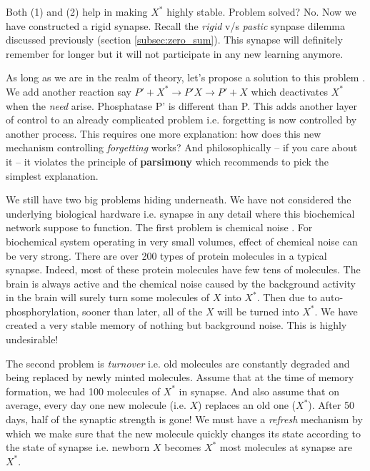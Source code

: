 \documentclass[]{resonance}
\begin{document}
Both (1) and (2) help in making $X^*$ highly stable. Problem solved? No.  Now
we have constructed a rigid synapse. Recall the \textit{rigid} v/s
\textit{pastic} synpase dilemma discussed previously (section
\ref{subsec:zero_sum}). This synapse will definitely remember for longer
but it will not participate in any new learning anymore.

As long as we are in the realm of theory, let's propose a solution to this
problem . We add another reaction say $P'+X^*\rightarrow P'X \rightarrow P'+X$
which deactivates $X^*$ when the \textit{need} arise. Phosphatase P' is different
than P. This adds another layer of control to an already complicated problem i.e.
forgetting is now controlled by another process. This requires one more
explanation: how does this new mechanism controlling \textit{forgetting} works?
And philosophically -- if you care about it -- it violates the principle of
\textbf{parsimony} which recommends to pick the simplest explanation.

We still have two big problems hiding underneath. We have not considered the
underlying biological hardware i.e. synapse in any detail where this biochemical
network suppose to function. The first problem is chemical noise 
. For biochemical system operating in very small volumes,
effect of chemical noise can be very strong.  There are over 200 types of
protein molecules in a typical synapse. Indeed, most of these protein molecules have few
tens of molecules.  The brain is always active and  the chemical noise caused by
the background activity in the brain will surely turn some molecules of $X$ into
$X^*$. Then due to auto-phosphorylation, sooner than later, all of the $X$ will be turned
into $X^*$. We have created a very stable memory of nothing but background
noise. This is highly undesirable!

The second problem is \textit{turnover} i.e. old molecules are constantly degraded
and being replaced by newly minted molecules. Assume that at the time of memory
formation, we had 100 molecules of $X^*$ in synapse. And also assume that on
average, every day one new molecule (i.e. $X$) replaces an old one ($X^*$).
After 50 days, half of the synaptic strength is gone! We must have a
\textit{refresh} mechanism by which we make sure that the new molecule quickly
changes its state according to the state of synapse i.e. newborn $X$ becomes
$X^*$ most molecules at synapse are $X^*$.
\end{document}
